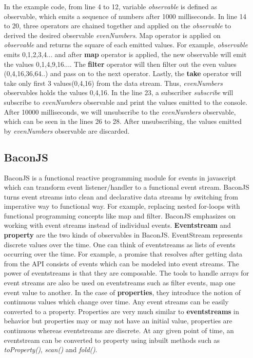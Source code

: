 In the example code, from line 4 to 12, variable \textit{observable} is defined as observable, which emits a sequence of numbers after 1000 milliseconds. In line 14 to 20, three operators are chained together and applied on the \textit{observable} to derived the desired observable \textit{evenNumbers}. Map operator is applied on \textit{observable} and returns the square of each emitted values. For example, \textit{observable} emits 0,1,2,3,4... and after \textbf{map} operator is applied, the new observable will emit the values 0,1,4,9,16.... The \textbf{filter} operator will then filter out the even values (0,4,16,36,64..) and pass on to the next operator. Lastly, the \textbf{take} operator will take only first 3 values(0,4,16) from the data stream. Thus, \textit{evenNumbers} observables holds the values 0,4,16. In the line 23, a subscriber \textit{subscribe} will subscribe to \textit{evenNumbers} observable and print the values emitted to the console. After 10000 milliseconds, we will unsubscribe to the \textit{evenNumbers} observable, which can be seen in the lines 26 to 28. After unsubscribing, the values emitted by \textit{evenNumbers} observable are discarded.


\subsection{BaconJS}
BaconJS is a functional reactive programming module for events in javascript which can transform event listener/handler to a functional event stream. BaconJS turns event streams into clean and declarative data streams by switching from imperative way to functional way. For example, replacing nested for-loops with functional programming concepts like map and filter. BaconJS emphasizes on working with event streams instead of individual events. \textbf{Eventstream} and \textbf{property} are the two kinds of observables in BaconJS. EventStream represents discrete values over the time. One can think of eventstreams as lists of events occurring over the time. For example, a promise that resolves after getting data from the API consists of events which can be modeled into event streams. The power of eventstreams is that they are composable. The tools to handle arrays for event streams are also be used on eventstreams such as filter events, map one event value to another. In the case of \textbf{properties}, they introduce the notion of continuous values which change over time. Any event streams can be easily converted to a property.  Properties are very much similar to \textbf{eventstreams} in behavior but properties may or may not have an initial value, properties are continuous whereas eventstreams are discrete. At any given point of time, an eventstream can be converted to property using inbuilt methods such as \textit{toProperty()}, \textit{scan()} and \textit{fold()}\cite{baconBlog}. 


